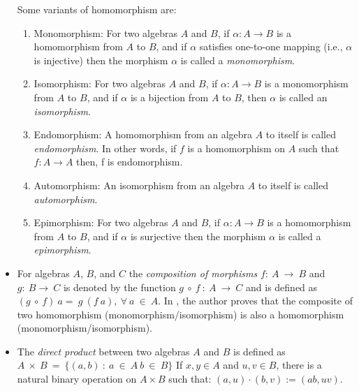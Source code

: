 \begin{itemize}
    Some variants of homomorphism are:
    \begin{enumerate}
        \item  Monomorphism: For two algebras $A$ and $B$, if \(\alpha : A
        \rightarrow B \) is a homomorphism from $A$ to $B$, and if \(\alpha\)
        satisfies one-to-one mapping (i.e., \(\alpha\) is injective) then the
        morphism \(\alpha\) is called a \textit{monomorphism}.

        \item Isomorphism: For two algebras $A$ and $B$, if \(\alpha : A \rightarrow B \)  is
        a monomorphism from $A$ to $B$, and if \(\alpha\) is a bijection from
        $A$ to $B$, then \(\alpha\) is called an \textit{isomorphism}.  

        \item Endomorphism: A homomorphism from an algebra $A$ to itself is
        called \textit{endomorphism}. In other words, if $f$ is a homomorphism on $A$
        such that $f:A\rightarrow A$ then, f is endomorphism.

        \item Automorphism: An isomorphism from an algebra $A$ to itself is
        called \textit{automorphism}.

        \item Epimorphism: For two algebras $A$ and $B$, if \(\alpha : A
        \rightarrow B \) is a homomorphism from $A$ to $B$, and if \(\alpha\) is
        surjective then the morphism \(\alpha\) is called a
        \textit{epimorphism}.
    \end{enumerate}

    \item For algebras $A$, $B$, and $C$ the \textit{composition of morphisms}
    $f:\ A \ \rightarrow \ B$ and $g:\ B \rightarrow\ C$ is denoted by the
    function $g\ \circ \ f\ :\ A\ \rightarrow \ C$ and is defined as $(g\ \circ \
    f)\ a = \ g\ (f\ a), \ \forall \ a\ \in\ A$. In \cite{sankappanavar1981course},
    the author proves that the composite of two homomorphism
    (monomorphism/isomorphism) is also a homomorphism
    (monomorphism/isomorphism).

    \item The \textit{direct product} between two algebras $A$ and $B$ is
    defined as $A\ \times\ B\ =\ \{ (a,b)\ :\ a \ \in \ A\ b \ \in \ B \}$ If
    $x,y\in A$ and $u,v \in B$, there is a natural binary operation on $A \times
    B$ such that: $(a,u)\cdot(b,v):=(ab,uv)$. 

\end{itemize}
